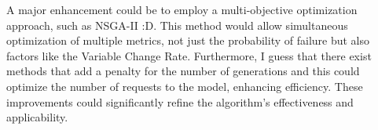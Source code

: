 \documentclass[12pt,letterpaper]{article}
\begin{document}
A major enhancement could be to employ a multi-objective optimization approach, such as NSGA-II :D. This method would allow simultaneous optimization of multiple metrics, not just the probability of failure but also factors like the Variable Change Rate. Furthermore, I guess that there exist methods that add a penalty for the number of generations and this could optimize the number of requests to the model, enhancing efficiency. These improvements could significantly refine the algorithm's effectiveness and applicability.
\end{document}
